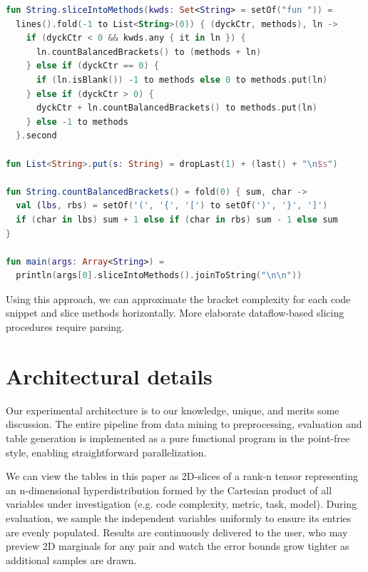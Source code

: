 \documentclass[sigconf,review,anonymous]{acmart}
\begin{document}
  \vspace{11pt}

  \begin{lstlisting}[basicstyle=\scriptsize\ttfamily, language=kotlin,label={lst:example4}]
fun String.sliceIntoMethods(kwds: Set<String> = setOf("fun ")) =
  lines().fold(-1 to List<String>(0)) { (dyckCtr, methods), ln ->
    if (dyckCtr < 0 && kwds.any { it in ln }) {
      ln.countBalancedBrackets() to (methods + ln)
    } else if (dyckCtr == 0) {
      if (ln.isBlank()) -1 to methods else 0 to methods.put(ln)
    } else if (dyckCtr > 0) {
      dyckCtr + ln.countBalancedBrackets() to methods.put(ln)
    } else -1 to methods
  }.second

fun List<String>.put(s: String) = dropLast(1) + (last() + "\n$s")

fun String.countBalancedBrackets() = fold(0) { sum, char ->
  val (lbs, rbs) = setOf('(', '{', '[') to setOf(')', '}', ']')
  if (char in lbs) sum + 1 else if (char in rbs) sum - 1 else sum
}

fun main(args: Array<String>) =
  println(args[0].sliceIntoMethods().joinToString("\n\n"))
  \end{lstlisting}

  Using this approach, we can approximate the bracket complexity for each code snippet and slice methods horizontally. More elaborate dataflow-based slicing procedures require parsing.

  \section{Architectural details}\label{sec:architecture}

  Our experimental architecture is to our knowledge, unique, and merits some discussion. The entire pipeline from data mining to preprocessing, evaluation and table generation is implemented as a pure functional program in the point-free style, enabling straightforward parallelization.

  We can view the tables in this paper as 2D-slices of a rank-n tensor representing an n-dimensional hyperdistribution formed by the Cartesian product of all variables under investigation (e.g. code complexity, metric, task, model). During evaluation, we sample the independent variables uniformly to ensure its entries are evenly populated. Results are continuously delivered to the user, who may preview 2D marginals for any pair and watch the error bounds grow tighter as additional samples are drawn.
\end{document}
